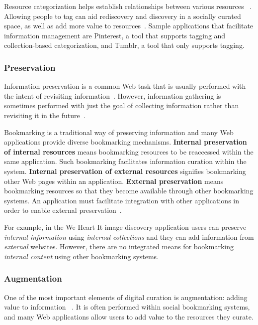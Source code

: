 \documentclass{sigchi}
\begin{document}
{{{Resource categorization helps establish relationships between various resources ~\cite{beagrie2008digital,whittaker2011personal}. Allowing people to tag can aid rediscovery and discovery in a socially curated space, as well as add more value to resources~\cite{gruber2007ontology}. Sample applications that facilitate information management are Pinterest, a tool that supports tagging and collection-based categorization, and Tumblr, a tool that only supports tagging.
} %

{\subsubsection{Preservation}
Information preservation is a common Web task that is usually performed with the intent of revisiting information~\cite{abrams1998information,whittaker2011personal}. However, information gathering is sometimes performed with just the goal of collecting information rather than revisiting it in the future~\cite{lindley2012s}. 

Bookmarking is a traditional way of preserving information and many Web applications provide diverse bookmarking mechanisms. \textbf{Internal preservation of internal resources} means bookmarking resources to be reaccessed within the same application. Such bookmarking facilitates information curation within the system. \textbf{Internal preservation of external resources} signifies bookmarking other Web pages within an application. \textbf{External preservation} means bookmarking resources so that they become available through other bookmarking systems. An application must facilitate integration with other applications in order to enable external preservation~\cite{abrams1998information}.

For example, in the We Heart It image discovery application users can preserve \textit{internal  information} using \textit{internal collections} and they can add information from \textit{external} websites. However, there are no integrated means for bookmarking \textit{internal content} using other bookmarking systems.  
} %

{\subsubsection{Augmentation}
One of the most important elements of digital curation is augmentation: adding value to information ~\cite{beagrie2008digital,whittaker2011personal}. It is often performed within social bookmarking systems, and many Web applications allow users to add value to the resources they curate. 

}}}
\end{document}
